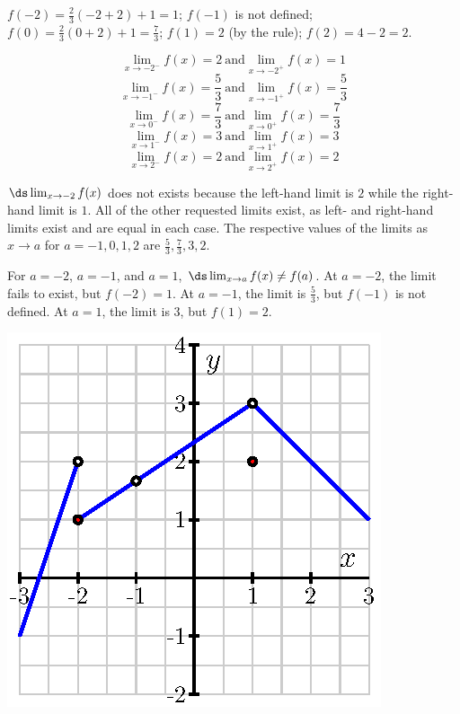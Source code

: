 \begin{activitySolution}
\ba
	\item $f(-2) = \frac{2}{3}(-2+2) + 1 = 1$; $f(-1)$ is not defined; $f(0) = \frac{2}{3}(0+2)+1 = \frac{7}{3}$; $f(1) = 2$ (by the rule); $f(2) = 4-2 = 2$.
	\item $$\lim_{x \to -2^-} f(x) = 2 \ \mbox{and} \lim_{x \to -2^+} f(x) = 1$$
	        $$\lim_{x \to -1^-} f(x) = \frac{5}{3} \ \mbox{and} \lim_{x \to -1^+} f(x) = \frac{5}{3}$$
	        $$\lim_{x \to 0^-} f(x) = \frac{7}{3} \ \mbox{and} \lim_{x \to 0^+} f(x) = \frac{7}{3}$$
	        $$\lim_{x \to 1^-} f(x) = 3 \ \mbox{and} \lim_{x \to 1^+} f(x) = 3$$
	        $$\lim_{x \to 2^-} f(x) = 2 \ \mbox{and} \lim_{x \to 2^+} f(x) = 2$$
	\item $\ds \lim_{x \to -2} f(x)$ does not exists because the left-hand limit is $2$ while the right-hand limit is $1$.  All of the other requested limits exist, as left- and right-hand limits exist and are equal in each case.  The respective values of the limits as $x \to a$ for $a = -1, 0, 1, 2$ are $\frac{5}{3}, \frac{7}{3}, 3, 2$.
	\item For $a = -2$, $a = -1$, and $a = 1$, $\ds \lim_{x \to a} f(x) \ne f(a)$.  At $a = -2$, the limit fails to exist, but $f(-2) = 1$.  At $a = -1$, the limit is $\frac{5}{3}$, but $f(-1)$ is not defined.  At $a = 1$, the limit is 3, but $f(1) = 2$.
	\item \includegraphics{figures/1_7_Act1Soln.eps}
\ea	        
\end{activitySolution}
\aftera